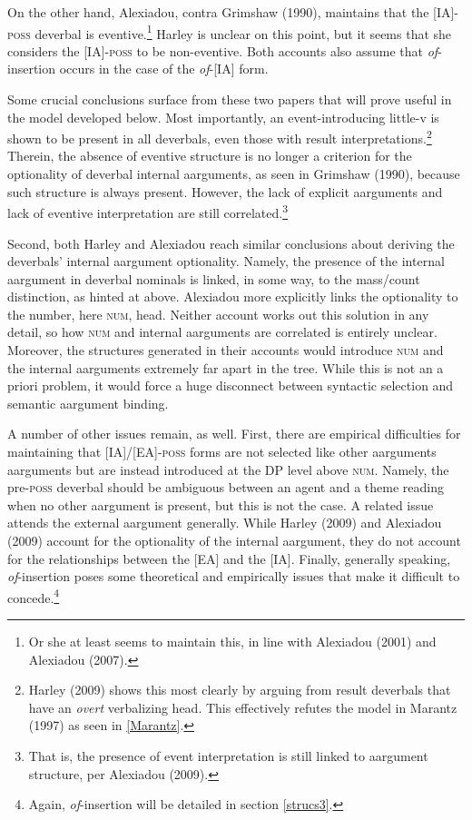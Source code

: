\documentclass[12pt]{article}
\begin{document}
On the other hand, Alexiadou, contra Grimshaw (1990), maintains that the [IA]-\textsc{poss} deverbal is eventive.\footnote{ Or she at least seems to maintain this, in line with Alexiadou (2001) and Alexiadou (2007).} Harley is unclear on this point, but it seems that she considers the [IA]-\textsc{poss} to be non-eventive. Both accounts also assume that \textit{of}-insertion occurs in the case of the \textit{of}-[IA] form.

Some crucial conclusions surface from these two papers that will prove useful in the model developed below. Most importantly, an event-introducing little-v is shown to be present in all deverbals, even those with result interpretations.\footnote{ Harley (2009) shows this most clearly by arguing from result deverbals that have an \textit{overt} verbalizing head. This effectively refutes the model in Marantz (1997) as seen in \ref{Marantz}.} Therein, the absence of eventive structure is no longer a criterion for the optionality of deverbal internal aarguments, as seen in Grimshaw (1990), because such structure is always present. However, the lack of explicit aarguments and lack of eventive interpretation are still correlated.\footnote{ That is, the presence of event interpretation is still linked to aargument structure, per Alexiadou (2009).}

Second, both Harley and Alexiadou reach similar conclusions about deriving the deverbals' internal aargument optionality. Namely, the presence of the internal aargument in deverbal nominals is linked, in some way, to the mass/count distinction, as hinted at above. Alexiadou more explicitly links the optionality to the number, here \textsc{num}, head. Neither account works out this solution in any detail, so how \textsc{num} and internal aarguments are correlated is entirely unclear. Moreover, the structures generated in their accounts would introduce \textsc{num} and the internal aarguments extremely far apart in the tree. While this is not an a priori problem, it would force a huge disconnect between syntactic selection and semantic aargument binding.

A number of other issues remain, as well. First, there are empirical difficulties for maintaining that [IA]/[EA]-\textsc{poss} forms are not selected like other aarguments aarguments but are instead introduced at the DP level above \textsc{num}. Namely, the pre-\textsc{poss} deverbal should be ambiguous between an agent and a theme reading when no other aargument is present, but this is not the case. A related issue attends the external aargument generally. While Harley (2009) and Alexiadou (2009) account for the optionality of the internal aargument, they do not account for the relationships between the [EA] and the [IA]. Finally, generally speaking, \textit{of}-insertion poses some theoretical and empirically issues that make it difficult to concede.\footnote{ Again, \textit{of}-insertion will be detailed in section \ref{strucs3}.}
\end{document}
